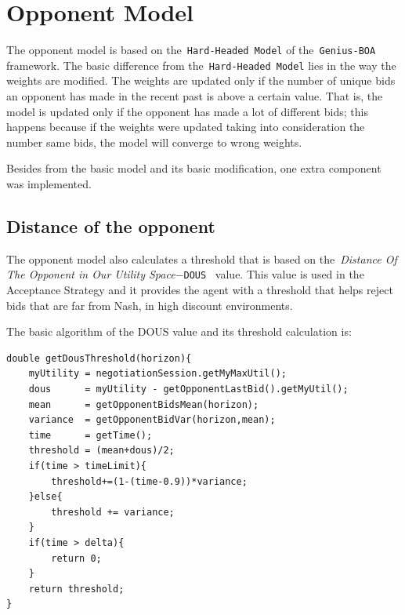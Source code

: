\documentclass[html]{report}    %
\begin{document}
\section{Opponent Model}  

The opponent model is based on the~\texttt{Hard-Headed Model} of the~\texttt{Genius-BOA} framework. The basic difference from the~\texttt{Hard-Headed Model} lies in the way the weights are modified. The weights are updated only if the number of unique bids an opponent has made in the recent past is above a certain value. That is, the model is updated only if the opponent has made a lot of different bids; this happens because if the weights were updated taking into consideration the number same bids, the model will converge to wrong weights.

Besides from the basic model and its basic modification, one extra component was implemented.~\cite{anac2013}

\subsection{Distance of the opponent}

The opponent model also calculates a threshold that is based on the~\textit{Distance Of The Opponent in Our Utility Space}$-$\texttt{DOUS}~\cite{anac2013} value. This value is used in the Acceptance Strategy and it provides the agent with a threshold that helps reject bids that are far from Nash, in high discount environments.

The basic algorithm of the DOUS value and its threshold calculation is:


\begin{verbatim}
double getDousThreshold(horizon){
    myUtility = negotiationSession.getMyMaxUtil();
    dous      = myUtility - getOpponentLastBid().getMyUtil();
    mean      = getOpponentBidsMean(horizon);
    variance  = getOpponentBidVar(horizon,mean);
    time      = getTime();
    threshold = (mean+dous)/2;
    if(time > timeLimit){
        threshold+=(1-(time-0.9))*variance;
    }else{
        threshold += variance;
    }
    if(time > delta){
        return 0;
    }    
    return threshold;
}
\end{verbatim}
\end{document}
